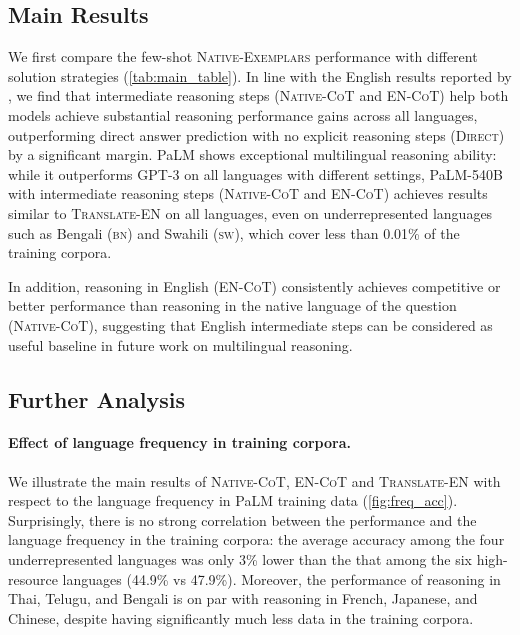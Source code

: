 \subsection{Main Results} We first compare the few-shot \textsc{Native-Exemplars} performance with different solution strategies (\ref{tab:main_table}).
In line with the English results reported by \citet{wei2022chain}, we find that intermediate reasoning steps (\textsc{Native-CoT} and \textsc{EN-CoT}) help both models achieve substantial reasoning performance gains across all languages, outperforming direct answer prediction with no explicit reasoning steps (\textsc{Direct}) by a significant margin. PaLM shows exceptional multilingual reasoning ability: while it outperforms GPT-3 on all languages with different settings, PaLM-540B with intermediate reasoning steps (\textsc{Native-CoT} and \textsc{EN-CoT}) achieves results similar to \textsc{Translate-EN} on all languages, even on underrepresented languages such as Bengali (\textsc{bn}) and Swahili (\textsc{sw}), which cover less than 0.01\% of the training corpora. 

In addition, reasoning in English (\textsc{EN-CoT}) consistently achieves competitive or better performance than reasoning in the native language of the question (\textsc{Native-CoT}), suggesting that English intermediate steps can be considered as useful baseline in future work on multilingual reasoning. 

\subsection{Further Analysis}
\label{sec:mgsm-analysis}
\paragraph{Effect of language frequency in training corpora.} We illustrate the main results of \textsc{Native-CoT}, \textsc{EN-CoT} and \textsc{Translate-EN} with respect to the language frequency in PaLM training data (\ref{fig:freq_acc}).
Surprisingly, there is no strong correlation between the performance and the language frequency in the training corpora: the average accuracy among the four underrepresented languages was only 3\% lower than the that among the six high-resource languages (44.9\% vs 47.9\%).
Moreover, the performance of reasoning in Thai, Telugu, and Bengali is on par with reasoning in French, Japanese, and Chinese, despite having significantly much less data in the training corpora. 

